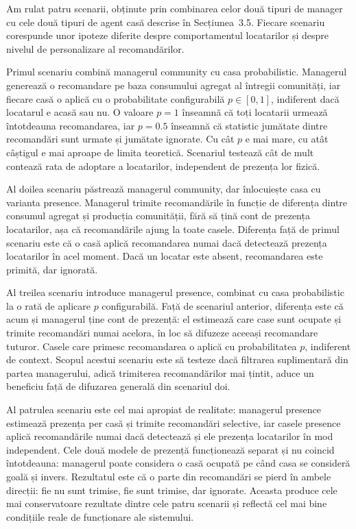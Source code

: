 \documentclass[12pt,a4paper]{report}
\begin{document}
Am rulat patru scenarii, obținute prin combinarea celor două tipuri de manager cu cele două tipuri de agent casă descrise în Secțiunea~3.5. Fiecare scenariu corespunde unor ipoteze diferite despre comportamentul locatarilor și despre nivelul de personalizare al recomandărilor.

Primul scenariu combină managerul community cu casa probabilistic. Managerul generează o recomandare pe baza consumului agregat al întregii comunități, iar fiecare casă o aplică cu o probabilitate configurabilă $p \in [0, 1]$, indiferent dacă locatarul e acasă sau nu. O valoare $p = 1$ înseamnă că toți locatarii urmează întotdeauna recomandarea, iar $p = 0.5$ înseamnă că statistic jumătate dintre recomandări sunt urmate și jumătate ignorate. Cu cât $p$ e mai mare, cu atât câștigul e mai aproape de limita teoretică. Scenariul testează cât de mult contează rata de adoptare a locatarilor, independent de prezența lor fizică.

Al doilea scenariu păstrează managerul community, dar înlocuiește casa cu varianta presence. Managerul trimite recomandările în funcție de diferența dintre consumul agregat și producția comunității, fără să țină cont de prezența locatarilor, așa că recomandările ajung la toate casele. Diferența față de primul scenariu este că o casă aplică recomandarea numai dacă detectează prezența locatarilor în acel moment. Dacă un locatar este absent, recomandarea este primită, dar ignorată.

Al treilea scenariu introduce managerul presence, combinat cu casa probabilistic la o rată de aplicare $p$ configurabilă. Față de scenariul anterior, diferența este că acum și managerul ține cont de prezență: el estimează care case sunt ocupate și trimite recomandări numai acelora, în loc să difuzeze aceeași recomandare tuturor. Casele care primesc recomandarea o aplică cu probabilitatea $p$, indiferent de context. Scopul acestui scenariu este să testeze dacă filtrarea suplimentară din partea managerului, adică trimiterea recomandărilor mai țintit, aduce un beneficiu față de difuzarea generală din scenariul doi.

Al patrulea scenariu este cel mai apropiat de realitate: managerul presence estimează prezența per casă și trimite recomandări selective, iar casele presence aplică recomandările numai dacă detectează și ele prezența locatarilor în mod independent. Cele două modele de prezență funcționează separat și nu coincid întotdeauna: managerul poate considera o casă ocupată pe când casa se consideră goală și invers. Rezultatul este că o parte din recomandări se pierd în ambele direcții: fie nu sunt trimise, fie sunt trimise, dar ignorate. Aceasta produce cele mai conservatoare rezultate dintre cele patru scenarii și reflectă cel mai bine condițiile reale de funcționare ale sistemului.
\end{document}
